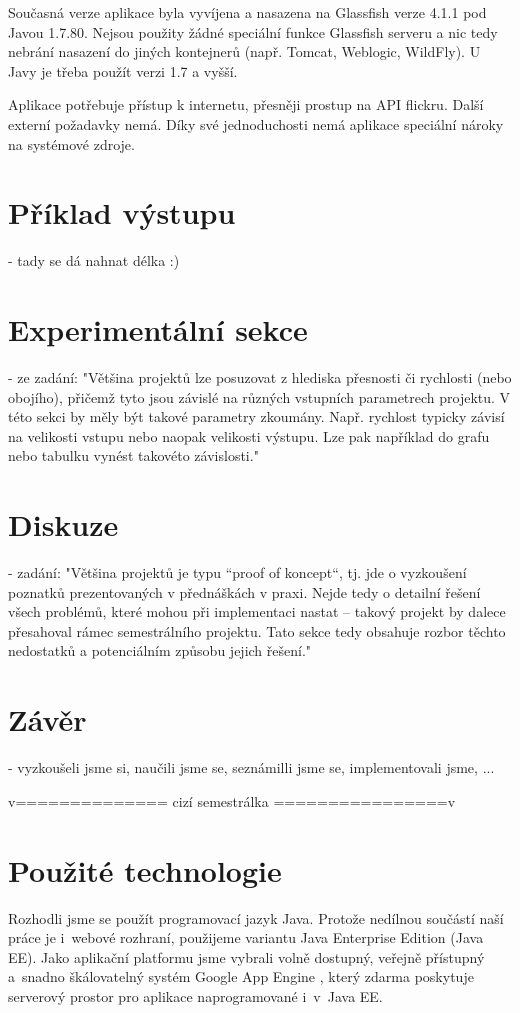 \documentclass[12pt,oneside,a4paper]{article}
\begin{document}
Současná verze aplikace byla vyvíjena a nasazena na Glassfish verze 4.1.1 pod Javou 1.7.80. Nejsou použity žádné speciální funkce Glassfish serveru a nic tedy nebrání nasazení do jiných kontejnerů (např. Tomcat, Weblogic, WildFly). U Javy je třeba použít verzi 1.7 a vyšší.

Aplikace potřebuje přístup k internetu, přesněji prostup na API flickru. Další externí požadavky nemá. Díky své jednoduchosti nemá aplikace speciální nároky na systémové zdroje.


\section{Příklad výstupu}
- tady se dá nahnat délka :)

\section{Experimentální sekce}
- ze zadání: "Většina projektů lze posuzovat z hlediska přesnosti či rychlosti (nebo obojího),
přičemž tyto jsou závislé na různých vstupních parametrech projektu. V této sekci by
měly být takové parametry zkoumány. Např. rychlost typicky závisí na velikosti
vstupu nebo naopak velikosti výstupu. Lze pak například do grafu nebo tabulku
vynést takovéto závislosti."

\section{Diskuze}
- zadání: "Většina projektů je typu “proof of koncept“, tj. jde o vyzkoušení poznatků
prezentovaných v přednáškách v praxi. Nejde tedy o detailní řešení všech problémů,
které mohou při implementaci nastat – takový projekt by dalece přesahoval rámec
semestrálního projektu. Tato sekce tedy obsahuje rozbor těchto nedostatků a
potenciálním způsobu jejich řešení."

\section{Závěr}
- vyzkoušeli jsme si, naučili jsme se, seznámilli jsme se, implementovali jsme, ...

v============== cizí semestrálka ================v

\section{Použité technologie}

Rozhodli jsme se použít programovací jazyk Java. Protože nedílnou součástí naší práce je i~webové rozhraní, použijeme variantu Java Enterprise Edition (Java EE). Jako aplikační platformu jsme vybrali volně dostupný, veřejně přístupný a~snadno škálovatelný systém Google App Engine \cite{GoogleAE}, který zdarma poskytuje serverový prostor pro aplikace naprogramované i~v~Java EE.
\end{document}
